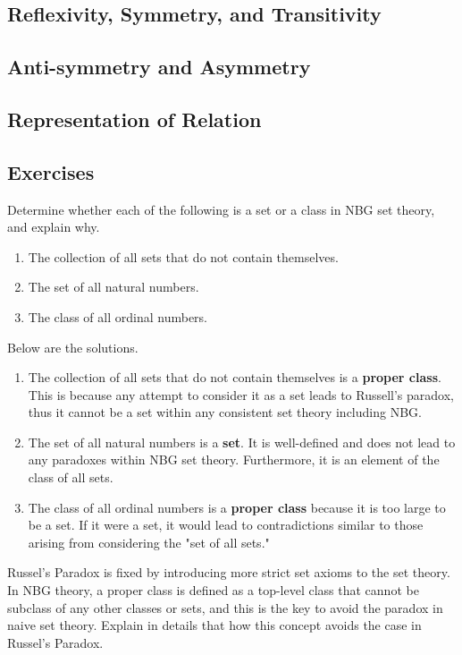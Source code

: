 \subsection{Reflexivity, Symmetry, and Transitivity}
\subsection{Anti-symmetry and Asymmetry}
\subsection{Representation of Relation}
\subsection{Exercises}
\begin{exercise}
	 Determine whether each of the following is a set or a class in NBG set theory, and explain why.
	\begin{enumerate}
		\item The collection of all sets that do not contain themselves.
		\item The set of all natural numbers.
		\item The class of all ordinal numbers.
	\end{enumerate}
\end{exercise}
\begin{solution}
	Below are the solutions.
	\begin{enumerate}
		\item The collection of all sets that do not contain themselves is a \textbf{proper class}. This is because any attempt to consider it as a set leads to Russell's paradox, thus it cannot be a set within any consistent set theory including NBG.
		\item The set of all natural numbers is a \textbf{set}. It is well-defined and does not lead to any paradoxes within NBG set theory. Furthermore, it is an element of the class of all sets.
		\item The class of all ordinal numbers is a \textbf{proper class} because it is too large to be a set. If it were a set, it would lead to contradictions similar to those arising from considering the "set of all sets."
	\end{enumerate}
\end{solution}
\begin{exercise}
    Russel's Paradox is fixed by introducing more strict set axioms to the set theory. In NBG theory, a
    proper class is defined as a top-level class that cannot be subclass of any other classes or sets, and
    this is the key to avoid the paradox in naive set theory. Explain in details that how 
    this concept avoids the case in Russel's Paradox.
\end{exercise}
